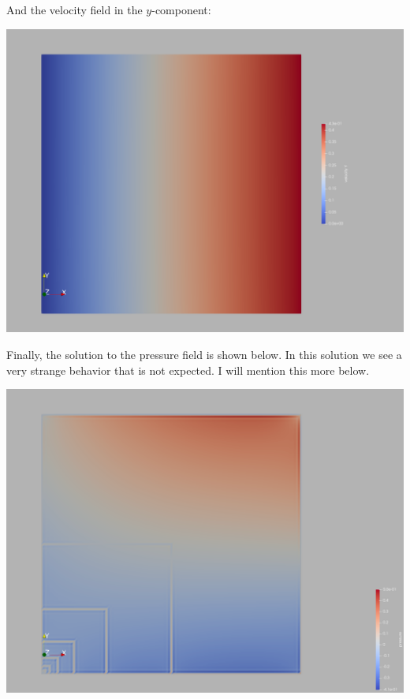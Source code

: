 \documentclass{article}
\begin{document}
                And the velocity field in the $y$-component:

                \begin{center}
                \includegraphics[scale=.2]{vel_y.png}
                \end{center}

                Finally, the solution to the pressure field is shown below. In this solution we see a very strange behavior that is not expected. I will mention this more below.

                \begin{center}
                \includegraphics[scale=.2]{pressure.png}
                \end{center}
\end{document}
